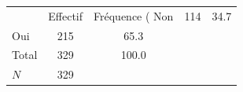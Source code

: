 {
\def\sym#1{\ifmmode^{#1}\else\(^{#1}\)\fi}
\begin{tabular}{l*{1}{cc}}
\toprule
            &    Effectif&Fréquence (%
\midrule
Non         &         114&        34.7\\
Oui         &         215&        65.3\\
Total       &         329&       100.0\\
\midrule
\(N\)       &         329&            \\
\bottomrule
\end{tabular}
}
